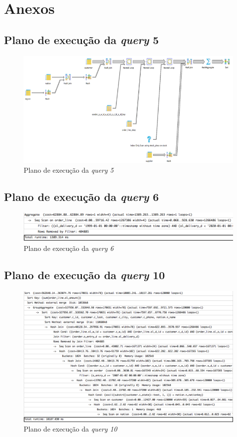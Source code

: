 \section{Anexos}



\subsection{Plano de execução da \textit{query} 5}

\begin{figure}[ht!]
\centering
\includegraphics[width=\textwidth]{img/00_query5_ant}
\caption{Plano de execução da \textit{query 5}\label{overflow}}
\end{figure}

\subsection{Plano de execução da \textit{query} 6}

\begin{figure}[ht!]
\centering
\includegraphics[width=\textwidth]{img/00_query6_ant}
\caption{Plano de execução da \textit{query 6}\label{overflow}}
\end{figure}

\newpage

\subsection{Plano de execução da \textit{query} 10}

\begin{figure}[ht!]
\centering
\includegraphics[width=\textwidth]{img/00_query10_ant}
\caption{Plano de execução da \textit{query 10}\label{overflow}}
\end{figure}
